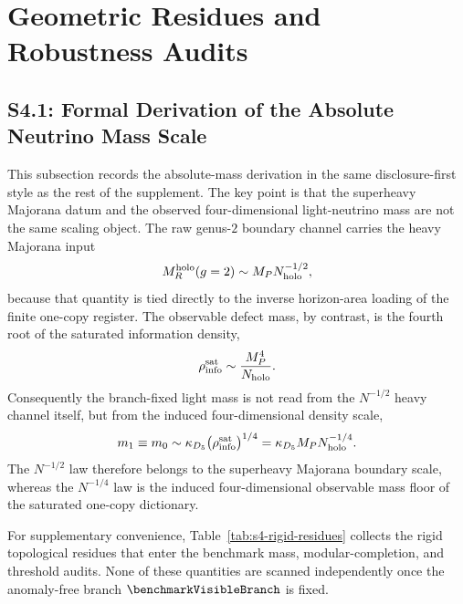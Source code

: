 \documentclass[11pt]{article}
\begin{document}
\section{Geometric Residues and Robustness Audits}

\subsection*{S4.1: Formal Derivation of the Absolute Neutrino Mass Scale}
\label{supp-sec:s4-absolute-neutrino-mass}

This subsection records the absolute-mass derivation in the same disclosure-first
style as the rest of the supplement. The key point is that the superheavy
Majorana datum and the observed four-dimensional light-neutrino mass are not
the same scaling object. The raw genus-$2$ boundary channel carries the heavy
Majorana input
\begin{equation}
 M_R^{\rm holo}(g=2)\sim M_P N_{\rm holo}^{-1/2},
\end{equation}
because that quantity is tied directly to the inverse horizon-area loading of
the finite one-copy register. The observable defect mass, by contrast, is the
fourth root of the saturated information density,
\begin{equation}
 \rho_{\rm info}^{\rm sat}
 \sim
 \frac{M_P^4}{N_{\rm holo}}.
\end{equation}
Consequently the branch-fixed light mass is not read from the $N^{-1/2}$ heavy
channel itself, but from the induced four-dimensional density scale,
\begin{equation}
 m_1\equiv m_0
 \sim
 \kappa_{D_5}\bigl(\rho_{\rm info}^{\rm sat}\bigr)^{1/4}
 =
 \kappa_{D_5} M_P N_{\rm holo}^{-1/4}.
\end{equation}
The $N^{-1/2}$ law therefore belongs to the superheavy Majorana boundary scale,
whereas the $N^{-1/4}$ law is the induced four-dimensional observable mass floor
of the saturated one-copy dictionary.

For supplementary convenience, Table~\ref{tab:s4-rigid-residues} collects the
rigid topological residues that enter the benchmark mass, modular-completion,
and threshold audits. None of these quantities are scanned independently once
the anomaly-free branch $\benchmarkVisibleBranch$ is fixed.
\end{document}
